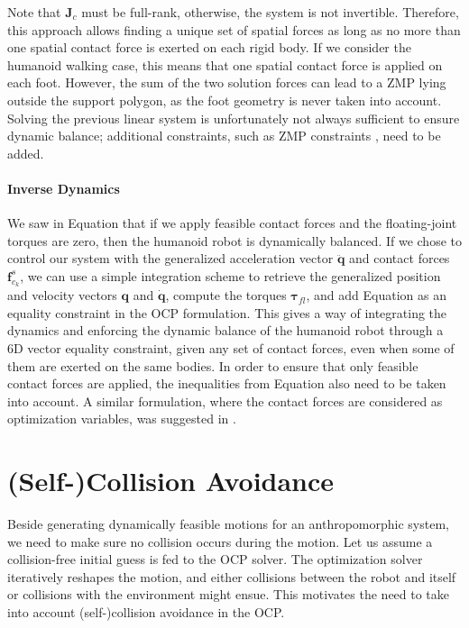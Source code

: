 
Note that $\mathbf{J}_{c}$ must be full-rank, otherwise, the system is
not invertible. Therefore, this approach allows finding a unique set
of spatial forces as long as no more than one spatial contact force is
exerted on each rigid body. If we consider the humanoid walking case,
this means that one spatial contact force is applied on each
foot. However, the sum of the two solution forces can lead to a ZMP
lying outside the support polygon, as the foot geometry is never taken
into account. Solving the previous linear system is unfortunately not
always sufficient to ensure dynamic balance; additional constraints,
such as ZMP constraints \cite{koch2012optimization}, need to be added.

\paragraph{Inverse Dynamics}

We saw in Equation  that if
we apply feasible contact forces and the floating-joint torques are
zero, then the humanoid robot is dynamically balanced. If we chose to
control our system with the generalized acceleration vector
$\mathbf{\ddot{q}}$ and contact forces $\mathbf{f}^s_{c_k}$, we can
use a simple integration scheme to retrieve the generalized position
and velocity vectors $\mathbf{q}$ and $\mathbf{\dot{q}}$, compute the
torques $\boldsymbol{\tau}_{fl}$, and add Equation
 as an equality constraint in
the OCP formulation. This gives a way of integrating the dynamics and
enforcing the dynamic balance of the humanoid robot through a 6D
vector equality constraint, given any set of contact forces, even when
some of them are exerted on the same bodies. In order to ensure that
only feasible contact forces are applied, the inequalities from
Equation  also need to be taken into
account. A similar formulation, where the contact forces are
considered as optimization variables, was suggested in
\cite{saab-tro-12}.

\section{(Self-)Collision Avoidance}
\label{sec:chap3-collision-avoidance}

Beside generating dynamically feasible motions for an anthropomorphic
system, we need to make sure no collision occurs during the
motion. Let us assume a collision-free initial guess is fed to the OCP
solver. The optimization solver iteratively reshapes the motion, and
either collisions between the robot and itself or collisions with the
environment might ensue. This motivates the need to take into account
(self-)collision avoidance in the OCP.

